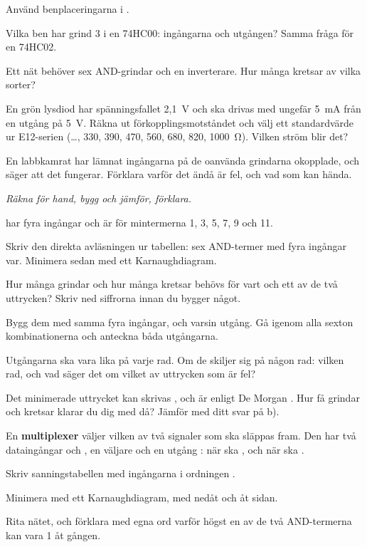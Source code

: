 \label{c4:ex:11}
Använd benplaceringarna i .
\begin{parts}
  \item Vilka ben har grind 3 i en 74HC00: ingångarna och utgången? Samma fråga för en 74HC02.
  \item Ett nät behöver sex AND-grindar och en inverterare. Hur många kretsar av vilka sorter?
  \item En grön lysdiod har spänningsfallet 2,1~V och ska drivas med ungefär 5~mA från en utgång
    på 5~V. Räkna ut förkopplingsmotståndet och välj ett standardvärde ur E12-serien (\dots, 330,
    390, 470, 560, 680, 820, 1000~Ω). Vilken ström blir det?
  \item En labbkamrat har lämnat ingångarna på de oanvända grindarna okopplade, och säger att det
    fungerar. Förklara varför det ändå är fel, och vad som kan hända.
\end{parts}

\label{c4:ex:12}
\emph{Räkna för hand, bygg och jämför, förklara.}

 har fyra ingångar och är  för mintermerna 1, 3, 5, 7, 9 och 11.

Skriv den direkta avläsningen ur tabellen: sex AND-termer med fyra ingångar var. Minimera sedan
med ett Karnaughdiagram.

Hur många grindar och hur många kretsar behövs för vart och ett av de två uttrycken? Skriv ned
siffrorna innan du bygger något.

Bygg dem med samma fyra ingångar, och varsin utgång. Gå igenom alla sexton kombinationerna och
anteckna båda utgångarna.

Utgångarna ska vara lika på varje rad. Om de skiljer sig på någon rad: vilken rad, och vad säger
det om vilket av uttrycken som är fel?

Det minimerade uttrycket kan skrivas , och  är enligt De Morgan
. Hur få grindar och kretsar klarar du dig med då? Jämför med ditt svar på b).

\label{c4:ex:13}
En \textbf{multiplexer} väljer vilken av två signaler som ska släppas fram. Den har två dataingångar
 och , en väljare  och en utgång : när  ska
, och när  ska .
\begin{parts}
  \item Skriv sanningstabellen med ingångarna i ordningen .
  \item Minimera med ett Karnaughdiagram, med  nedåt och  åt sidan.
  \item Rita nätet, och förklara med egna ord varför högst en av de två AND-termerna kan vara 1 åt
    gången.
\end{parts}

